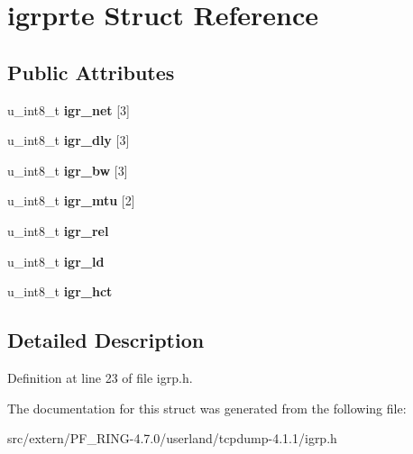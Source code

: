 \hypertarget{structigrprte}{
\section{igrprte Struct Reference}
\label{structigrprte}
}
\subsection*{Public Attributes}
\begin{DoxyCompactItemize}
\item 
\hypertarget{structigrprte_a377c230be5c829f6e29523b8f0aac062}{
u\_\-int8\_\-t {\bfseries igr\_\-net} \mbox{[}3\mbox{]}}
\label{structigrprte_a377c230be5c829f6e29523b8f0aac062}

\item 
\hypertarget{structigrprte_aac230f0071239c4764fb1ee5a6eab6dc}{
u\_\-int8\_\-t {\bfseries igr\_\-dly} \mbox{[}3\mbox{]}}
\label{structigrprte_aac230f0071239c4764fb1ee5a6eab6dc}

\item 
\hypertarget{structigrprte_a1cf1335befeefa56d0f8370e05afa003}{
u\_\-int8\_\-t {\bfseries igr\_\-bw} \mbox{[}3\mbox{]}}
\label{structigrprte_a1cf1335befeefa56d0f8370e05afa003}

\item 
\hypertarget{structigrprte_af9bdfcd436085de6c3a28848ba334043}{
u\_\-int8\_\-t {\bfseries igr\_\-mtu} \mbox{[}2\mbox{]}}
\label{structigrprte_af9bdfcd436085de6c3a28848ba334043}

\item 
\hypertarget{structigrprte_a1d331ea81501206116b85f6d47ee1969}{
u\_\-int8\_\-t {\bfseries igr\_\-rel}}
\label{structigrprte_a1d331ea81501206116b85f6d47ee1969}

\item 
\hypertarget{structigrprte_a84c61e1e9f3c03b3d6beda4bd34d8c0a}{
u\_\-int8\_\-t {\bfseries igr\_\-ld}}
\label{structigrprte_a84c61e1e9f3c03b3d6beda4bd34d8c0a}

\item 
\hypertarget{structigrprte_a5aa3d6be14bb1fe4ed35cfd8b0305b9f}{
u\_\-int8\_\-t {\bfseries igr\_\-hct}}
\label{structigrprte_a5aa3d6be14bb1fe4ed35cfd8b0305b9f}

\end{DoxyCompactItemize}


\subsection{Detailed Description}


Definition at line 23 of file igrp.h.



The documentation for this struct was generated from the following file:\begin{DoxyCompactItemize}
\item 
src/extern/PF\_\-RING-\/4.7.0/userland/tcpdump-\/4.1.1/igrp.h\end{DoxyCompactItemize}
